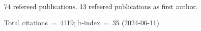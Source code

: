 74 refereed publications. 13 refeered publications as first author.

Total citations~=~4119; h-index~=~35 (2024-06-11)